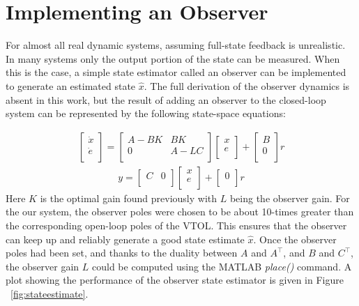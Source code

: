\documentclass[dvips,12pt]{article}
\begin{document}
\section{Implementing an Observer}

For almost all real dynamic systems, assuming full-state feedback is unrealistic.  In many systems only the output portion of the state can be measured.  When this is the case, a simple state estimator called an observer can be implemented to generate an estimated state $\hat{x}$. The full derivation of the observer dynamics is absent in this work, but the result of adding an observer to the closed-loop system can be represented by the following state-space equations:

{\begin{gather}
 \begin{bmatrix}
     \dot{x} \\
     \dot{e} \\
   \end{bmatrix}
   =   
   \begin{bmatrix}
        A-BK & BK  \\
        0 & A-LC  \\
      \end{bmatrix}
      \begin{bmatrix}
           x \\
           e \\
         \end{bmatrix}
         +
         \begin{bmatrix}
                    B \\
                    0 \\
                  \end{bmatrix}
                  r         
\end{gather}}
{\begin{gather}
   y
   =   
   \begin{bmatrix}
        C & 0  \\
      \end{bmatrix}
      \begin{bmatrix}
           x \\
           e \\
         \end{bmatrix}
         +
         \begin{bmatrix}
                    0 \\
                  \end{bmatrix}
                  r         
\end{gather}}
Here $K$ is the optimal gain found previously with $L$ being the observer gain.  For the our system, the observer poles were chosen to be about 10-times greater than the corresponding open-loop poles of the VTOL.  This ensures that the observer can keep up and reliably generate a good state estimate $\hat{x}$.  Once the observer poles had been set, and thanks to the duality between $A$ and $A^\intercal$, and $B$ and $C^\intercal$,  the observer gain $L$ could be computed using the MATLAB \textit{place()} command.  A plot showing the performance of the observer state estimator is given in Figure  ~\ref{fig:stateestimate}.
\end{document}
